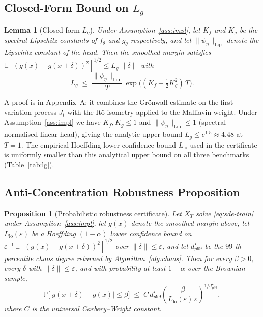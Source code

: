 \documentclass{ieeeaccess}
\newtheorem{lemma}[theorem]{Lemma}
\newtheorem{proposition}[theorem]{Proposition}
\newcommand{\Exp}{\mathbb{E}}
\newcommand{\Prob}{\mathbb{P}}
\newcommand{\Lip}{\mathrm{Lip}}
\begin{document}
\subsection{Closed-Form Bound on $L_g$}\label{subsec:lg}
\begin{lemma}[Closed-form $L_g$]\label{lem:closed-lg}
Under Assumption~\ref{ass:impl}, let $K_f$ and $K_g$ be the spectral
Lipschitz constants of $f_\theta$ and $g_\theta$ respectively, and let
$\|\psi_\eta\|_\Lip$ denote the Lipschitz constant of the head. Then
the smoothed margin satisfies
$\Exp[(g(x)-g(x+\delta))^2]^{1/2} \leq L_g\,\|\delta\|$
with
\begin{equation}\label{eq:closed-lg}
  L_g \;\leq\; \frac{\|\psi_\eta\|_\Lip}{T}\,
                \exp\!\bigl( (K_f + \tfrac{1}{2}K_g^2)\,T\bigr).
\end{equation}
\end{lemma}
\noindent A proof is in Appendix~A; it combines the Grönwall estimate on
the first-variation process $J_t$ with the Itô isometry applied to the
Malliavin weight. Under Assumption~\ref{ass:impl} we have
$K_f,K_g\leq 1$ and $\|\psi_\eta\|_\Lip\leq 1$ (spectral-normalised
linear head), giving the analytic upper bound
$L_g\leq e^{1.5}\approx 4.48$ at $T=1$. The empirical
Hoeffding lower confidence bound
$L_{\mathrm{lo}}$ used in the certificate is uniformly smaller than
this analytical upper bound on all three benchmarks (Table~\ref{tab:lg}).

\subsection{Anti-Concentration Robustness Proposition}\label{subsec:prop}
\begin{proposition}[Probabilistic robustness certificate]\label{prop:robust}
Let $X_T$ solve \eqref{eq:sde-train} under Assumption~\ref{ass:impl},
let $g(x)$ denote the smoothed margin above, let $L_{\mathrm{lo}}(\varepsilon)$
be a Hoeffding $(1-\alpha)$ lower confidence bound on
$\varepsilon^{-1}\,\Exp[(g(x)-g(x+\delta))^2]^{1/2}$ over
$\|\delta\|\leq\varepsilon$, and let $d^\star_{p99}$ be the $99$-th
percentile chaos degree returned by Algorithm~\ref{alg:chaos}. Then
for every $\beta>0$, every $\delta$ with $\|\delta\|\leq\varepsilon$,
and with probability at least $1-\alpha$ over the Brownian sample,
\begin{equation}\label{eq:robust-bound}
   \Prob\!\bigl[|g(x+\delta)-g(x)|\leq\beta\bigr]\;\leq\;
   C\,d^\star_{p99}\!\left(\frac{\beta}{L_{\mathrm{lo}}(\varepsilon)\,\varepsilon}\right)^{\!1/d^\star_{p99}},
\end{equation}
where $C$ is the universal Carbery--Wright constant.
\end{proposition}
\end{document}
